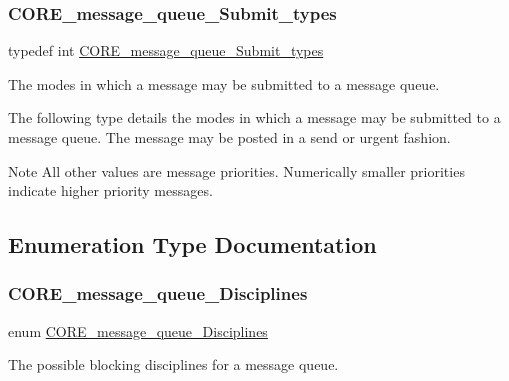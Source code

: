 \subsubsection{\texorpdfstring{CORE\_message\_queue\_Submit\_types}{CORE\_message\_queue\_Submit\_types}}
{\footnotesize\ttfamily typedef int \mbox{\hyperlink{group__RTEMSScoreMessageQueue_ga0859edb437502e53fd2c7a73bce6b33c}{C\+O\+R\+E\+\_\+message\+\_\+queue\+\_\+\+Submit\+\_\+types}}}



The modes in which a message may be submitted to a message queue. 

The following type details the modes in which a message may be submitted to a message queue. The message may be posted in a send or urgent fashion.

\begin{DoxyNote}{Note}
All other values are message priorities. Numerically smaller priorities indicate higher priority messages. 
\end{DoxyNote}


\subsection{Enumeration Type Documentation}
\mbox{\label{group__RTEMSScoreMessageQueue_gaaeca88271cd9bc9ed7cf6996915481d0}} 
\subsubsection{\texorpdfstring{CORE\_message\_queue\_Disciplines}{CORE\_message\_queue\_Disciplines}}
{\footnotesize\ttfamily enum \mbox{\hyperlink{group__RTEMSScoreMessageQueue_gaaeca88271cd9bc9ed7cf6996915481d0}{C\+O\+R\+E\+\_\+message\+\_\+queue\+\_\+\+Disciplines}}}



The possible blocking disciplines for a message queue. 

